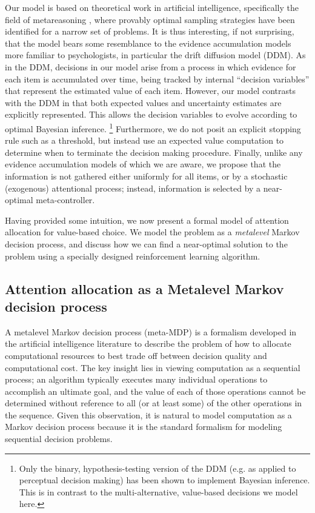 \documentclass[12pt,a4paperpaper,]{article}
\begin{document}
Our model is based on theoretical work in artificial intelligence, specifically the field of metareasoning \citep{Hay2012}, where provably optimal sampling strategies have been identified for a narrow set of problems. It is thus interesting, if not surprising, that the model bears some resemblance to the evidence accumulation models more familiar to psychologists, in particular the drift diffusion model (DDM). As in the DDM, decisions in our model arise from a process in which evidence for each item is accumulated over time, being tracked by internal ``decision variables'' that represent the estimated value of each item. However, our model contrasts with the DDM in that both expected values and uncertainty estimates are explicitly represented. This allows the decision variables to evolve according to optimal Bayesian inference.%
  \footnote{Only the binary, hypothesis-testing version of the DDM (e.g. as applied to perceptual decision making) has been shown to implement Bayesian inference. This is in contrast to the multi-alternative, value-based decisions we model here.}
Furthermore, we do not posit an explicit stopping rule such as a threshold, but instead use an expected value computation to determine when to terminate the decision making procedure. Finally, unlike any evidence accumulation models of which we are aware, we propose that the information is not gathered either uniformly for all items, or by a stochastic (exogenous) attentional process; instead, information is selected by a near-optimal meta-controller.

Having provided some intuition, we now present a formal model of attention allocation for value-based choice. We model the problem as a \emph{metalevel} Markov decision process, and discuss how we can find a near-optimal solution to the problem using a specially designed reinforcement learning algorithm.

\subsection{Attention allocation as a Metalevel Markov decision process}

A metalevel Markov decision process (meta-MDP) is a formalism developed in the artificial intelligence literature to describe the problem of how to allocate computational resources to best trade off between decision quality and computational cost. The key insight lies in viewing computation as a sequential process; an algorithm typically executes many individual operations to accomplish an ultimate goal, and the value of each of those operations cannot be determined without reference to all (or at least some) of the other operations in the sequence. Given this observation, it is natural to model computation as a Markov decision process because it is the standard formalism for modeling sequential decision problems.
\end{document}
